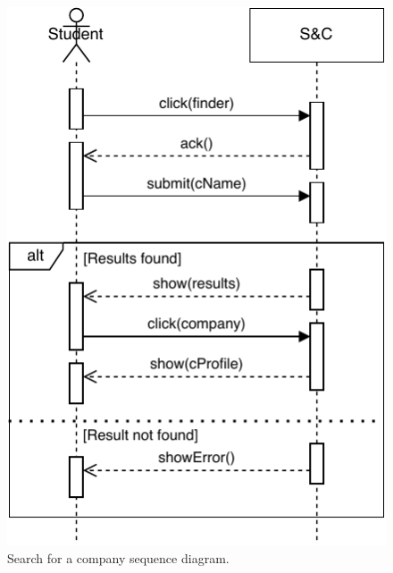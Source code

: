 \begin{figure}[H]
    \begin{center}
        \includegraphics[width=0.7\linewidth]{Images/SequenceDiagram/SearchCompanySD.pdf}
        \caption{Search for a company sequence diagram.}
        \label{fig:search_for_a_company_seqdiag}%
    \end{center}
\end{figure}

\newpage


